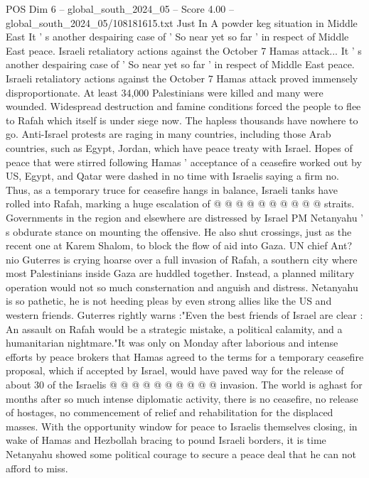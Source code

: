 \begin{textsample}{POS Dim 6 – global\_south\_2024\_05 – Score 4.00 – global\_south\_2024\_05/108181615.txt}  \label{ex:f6_pos_214}
Just In A powder keg situation in Middle East It ' s another despairing case of ' So near yet so far ' in respect of Middle East peace.
Israeli retaliatory actions against the October 7 Hamas attack...
It ' s another despairing case of ' So near yet so far ' in respect of Middle East peace.
Israeli retaliatory actions against the October 7 Hamas attack proved immensely disproportionate.
At least 34,000 Palestinians were killed and many were wounded.
Widespread destruction and famine conditions forced the people to flee to Rafah which itself is under siege now.
The hapless thousands have nowhere to go.
Anti-Israel protests are raging in many countries, including those Arab countries, such as Egypt, Jordan, which have peace treaty with Israel.
Hopes of peace that were stirred following Hamas ' acceptance of a ceasefire worked out by US, Egypt, and Qatar were dashed in no time with Israelis saying a firm no.
Thus, as a temporary truce for ceasefire hangs in balance, Israeli tanks have rolled into Rafah, marking a huge escalation of @ @ @ @ @ @ @ @ @ @ straits.
Governments in the region and elsewhere are distressed by Israel PM Netanyahu ' s obdurate stance on mounting the offensive.
He also shut crossings, just as the recent one at Karem Shalom, to block the flow of aid into Gaza.
UN chief Ant? nio Guterres is crying hoarse over a full invasion of Rafah, a southern city where most Palestinians inside Gaza are huddled together.
Instead, a planned military operation would not so much consternation and anguish and distress.
Netanyahu is so pathetic, he is not heeding pleas by even strong allies like the US and western friends.
Guterres rightly warns :"Even the best friends of Israel are clear : An assault on Rafah would be a strategic mistake, a political calamity, and a humanitarian nightmare."It was only on Monday after laborious and intense efforts by peace brokers that Hamas agreed to the terms for a temporary ceasefire proposal, which if accepted by Israel, would have paved way for the release of about 30 of the Israelis @ @ @ @ @ @ @ @ @ @ invasion.
The world is aghast for months after so much intense diplomatic activity, there is no ceasefire, no release of hostages, no commencement of relief and rehabilitation for the displaced masses.
With the opportunity window for peace to Israelis themselves closing, in wake of Hamas and Hezbollah bracing to pound Israeli borders, it is time Netanyahu showed some political courage to secure a peace deal that he can not afford to miss.

\end{textsample}
